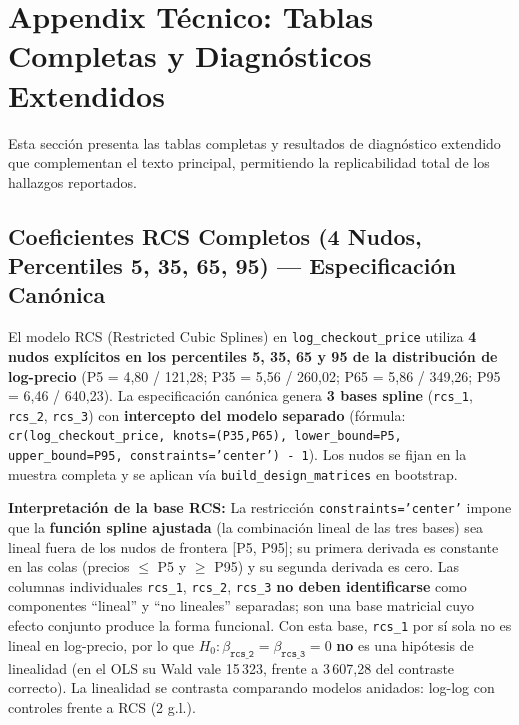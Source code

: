 \documentclass[doc, a4paper, biblatex, floatsintext, longtable, babel]{apa7}
\begin{document}
\printbibliography

\appendix
\section{Appendix Técnico: Tablas Completas y Diagnósticos Extendidos}
\label{sec:appendix}

Esta sección presenta las tablas completas y resultados de diagnóstico extendido que complementan el texto principal, permitiendo la replicabilidad total de los hallazgos reportados.

\subsection{Coeficientes RCS Completos (4 Nudos, Percentiles 5, 35, 65, 95) --- Especificación Canónica}
\label{subsec:appendix_rcs}

El modelo RCS (Restricted Cubic Splines) en \texttt{log\_checkout\_price} utiliza \textbf{4 nudos explícitos en los percentiles 5, 35, 65 y 95 de la distribución de log-precio} (P5 = 4,80 / 121,28; P35 = 5,56 / 260,02; P65 = 5,86 / 349,26; P95 = 6,46 / 640,23). La especificación canónica genera \textbf{3 bases spline} (\texttt{rcs\_1}, \texttt{rcs\_2}, \texttt{rcs\_3}) con \textbf{intercepto del modelo separado} (fórmula: \texttt{cr(log\_checkout\_price, knots=(P35,P65), lower\_bound=P5, upper\_bound=P95, constraints='center') - 1}). Los nudos se fijan en la muestra completa y se aplican vía \texttt{build\_design\_matrices} en bootstrap.

\textbf{Interpretación de la base RCS:} La restricción \texttt{constraints='center'} impone que la \textbf{función spline ajustada} (la combinación lineal de las tres bases) sea lineal fuera de los nudos de frontera [P5, P95]; su primera derivada es constante en las colas (precios $\le$ P5 y $\ge$ P95) y su segunda derivada es cero. Las columnas individuales \texttt{rcs\_1}, \texttt{rcs\_2}, \texttt{rcs\_3} \textbf{no deben identificarse} como componentes ``lineal'' y ``no lineales'' separadas; son una base matricial cuyo efecto conjunto produce la forma funcional. Con esta base, \texttt{rcs\_1} por sí sola no es lineal en log-precio, por lo que $H_0: \beta_{\texttt{rcs\_2}} = \beta_{\texttt{rcs\_3}} = 0$ \textbf{no} es una hipótesis de linealidad (en el OLS su Wald vale 15\,323, frente a 3\,607,28 del contraste correcto). La linealidad se contrasta comparando modelos anidados: log-log con controles frente a RCS (2 g.l.).
\end{document}
